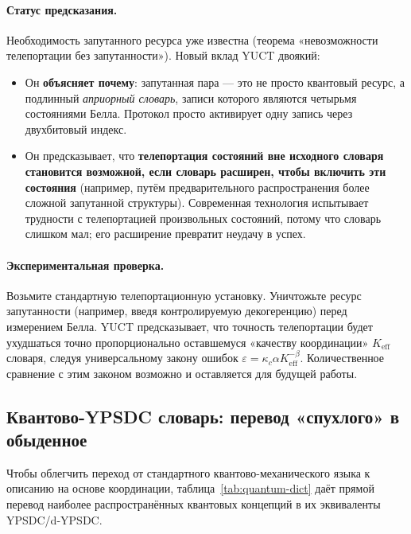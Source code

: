 \documentclass[12pt,a4paper]{article}
\theoremstyle{remark}
\begin{document}
	\paragraph{Статус предсказания.}
	Необходимость запутанного ресурса уже известна (теорема «невозможности телепортации без запутанности»). Новый вклад YUCT двоякий:
	
	\begin{itemize}
		\item Он \textbf{объясняет почему}: запутанная пара — это не просто квантовый ресурс, а подлинный \emph{априорный словарь}, записи которого являются четырьмя состояниями Белла. Протокол просто активирует одну запись через двухбитовый индекс.
		\item Он предсказывает, что \textbf{телепортация состояний вне исходного словаря становится возможной, если словарь расширен, чтобы включить эти состояния} (например, путём предварительного распространения более сложной запутанной структуры). Современная технология испытывает трудности с телепортацией произвольных состояний, потому что словарь слишком мал; его расширение превратит неудачу в успех.
	\end{itemize}
	
	\paragraph{Экспериментальная проверка.}
	Возьмите стандартную телепортационную установку. Уничтожьте ресурс запутанности (например, введя контролируемую декогеренцию) перед измерением Белла. YUCT предсказывает, что точность телепортации будет ухудшаться точно пропорционально оставшемуся «качеству координации» $K_{\mathrm{eff}}$ словаря, следуя универсальному закону ошибок $\varepsilon = \kappa_c \alpha K_{\mathrm{eff}}^{-\beta}$. Количественное сравнение с этим законом возможно и оставляется для будущей работы.
	
	\subsection{Квантово-YPSDC словарь: перевод «спухлого» в обыденное}
	
	Чтобы облегчить переход от стандартного квантово-механического языка к описанию на основе координации, таблица~\ref{tab:quantum-dict} даёт прямой перевод наиболее распространённых квантовых концепций в их эквиваленты YPSDC/d-YPSDC.
	
\end{document}
